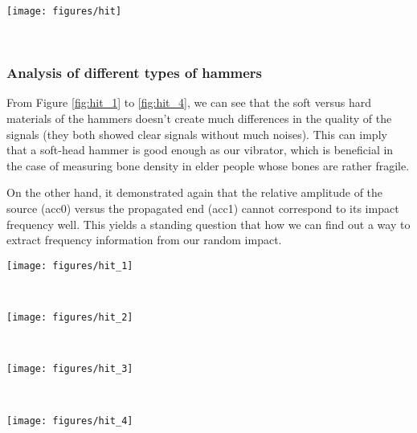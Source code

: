 \documentclass{sigchi}
\begin{document}
\begin{figure*}
  \centering
  \texttt{[image: figures/hit]}
  \caption{Pose 9 to 12 for accelerometers measurement: (a) Soft big-head hammer; (b) Soft small-head hammer; (c) Hard flat-head hammer; (d) Hard round-head hammer.}
    ~\label{fig:hit}
\end{figure*}

\subsubsection{Analysis of different types of hammers} 

From Figure \ref{fig:hit_1} to \ref{fig:hit_4}, we can see that the soft versus hard materials of the hammers doesn't create much differences in the quality of the signals (they both showed clear signals without much noises). This can imply that a soft-head hammer is good enough as our vibrator, which is beneficial in the case of measuring bone density in elder people whose bones are rather fragile. 

On the other hand, it demonstrated again that the relative amplitude of the source (acc0) versus the propagated end (acc1) cannot correspond to its impact frequency well. This yields a standing question that how we can find out a way to extract frequency information from our random impact.

\begin{figure*}
  \centering
  \texttt{[image: figures/hit\_1]}
  \caption{accelerometer signals vs. time in pose 9: soft big-head hammer.}
    ~\label{fig:hit_1}
\end{figure*}

\begin{figure*}
  \centering
  \texttt{[image: figures/hit\_2]}
  \caption{accelerometer signals vs. time in pose 10: soft small-head hammer.}
    ~\label{fig:hit_2}
\end{figure*}

\begin{figure*}
  \centering
  \texttt{[image: figures/hit\_3]}
  \caption{accelerometer signals vs. time in pose 11: hard flat-head hammer.}
    ~\label{fig:hit_3}
\end{figure*}

\begin{figure*}
  \centering
  \texttt{[image: figures/hit\_4]}
  \caption{accelerometer signals vs. time in pose 12: hard round-head hammer.}
    ~\label{fig:hit_4}
\end{figure*}
\end{document}
